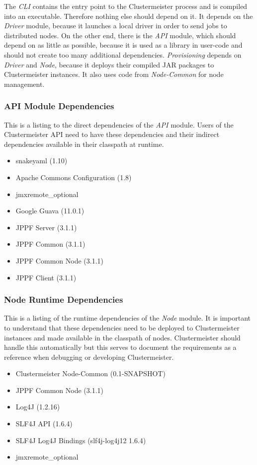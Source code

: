 \documentclass[english]{uzhpub}
\begin{document}
The \textit{CLI} contains the entry point to the Clustermeister process and is compiled into an executable. Therefore nothing else should depend on it. It depends on the \textit{Driver} module, because it launches a local driver in order to send jobs to distributed nodes. On the other end, there is the \textit{API} module, which should depend on as little as possible, because it is used as a library in user-code and should not create too many additional dependencies. \textit{Provisioning} depends on \textit{Driver} and \textit{Node}, because it deploys their compiled JAR packages to Clustermeister instances. It also uses code from \textit{Node-Common} for node management.

\subsubsection{API Module Dependencies}
This is a listing to the direct dependencies of the \textit{API} module. Users of the Clustermeister API need to have these dependencies and their indirect dependencies available in their classpath at runtime.

\begin{itemize}
\item snakeyaml (1.10)
\item Apache Commons Configuration (1.8)
\item jmxremote\_optional
\item Google Guava (11.0.1)
\item JPPF Server (3.1.1)
\item JPPF Common (3.1.1)
\item JPPF Common Node (3.1.1)
\item JPPF Client (3.1.1)
\end{itemize} 

\subsubsection{Node Runtime Dependencies}
This is a listing of the runtime dependencies of the \textit{Node} module. It is important to understand that these dependencies need to be deployed to Clustermeister instances and made available in the classpath of nodes. Clustermeister should handle this automatically but this serves to document the requirements as a reference when debugging or developing Clustermeister.

\begin{itemize}
\item Clustermeister Node-Common (0.1-SNAPSHOT)
\item JPPF Common Node (3.1.1)
\item Log4J (1.2.16)
\item SLF4J API (1.6.4)
\item SLF4J Log4J Bindings (slf4j-log4j12 1.6.4)
\item jmxremote\_optional
\end{itemize}
\end{document}
